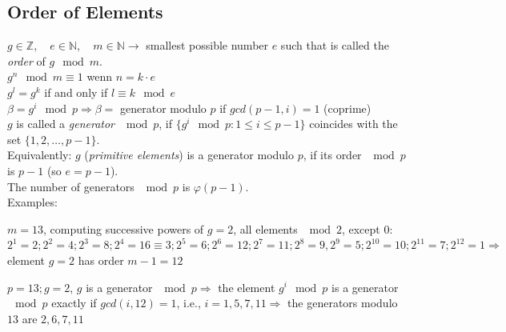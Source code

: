 \subsection{Order of Elements}
$g \in \mathbb{Z}, \quad e \in \mathbb{N}, \quad m \in \mathbb{N} \rightarrow$ smallest possible number $e$ such that  is called the \textit{order} of $g \mod m$.\\
$g^n \mod m \equiv 1 $ wenn $n=k\cdot e$\\
$g^l = g^k$ if and only if $l\equiv k \mod e$\\ 
$\beta = g^i \mod p \Rightarrow \beta =$ generator modulo $p$ if $gcd(p-1,i)=1$ (coprime)\\
$g$ is called a \textit{generator} $\mod p$, if $\{g^i \mod p : 1 \leq i \leq p-1\}$ coincides with the set $\{1,2,\ldots,p-1\}$.\\
Equivalently: $g$ (\textit{primitive elements}) is a generator modulo $p$, if its order $\mod p$ is $p-1$ (so $e=p-1$).\\
The number of generators $\mod p$ is $\varphi(p-1)$.\\
Examples:
\begin{liste}
	\item $m=13$, computing successive powers of $g=2$, all elements $\mod 2$, except 0: $2^1=2; 2^2=4; 2^3=8; 2^4=16\equiv3; 2^5=6; 2^6=12; 2^7=11; 2^8=9, 2^9=5; 2^{10}=10; 2^{11}=7; 2^{12}=1 \Rightarrow$ element $g=2$ has order $m-1=12$
	\item $p=13; g=2$, $g$ is a generator $\mod p \Rightarrow$ the element $g^i \mod p$ is a generator $\mod p$ exactly if $gcd(i,12)=1$, i.e., $i=1,5,7,11 \Rightarrow$ the generators modulo $13$ are $2,6,7,11$
\end{liste}

